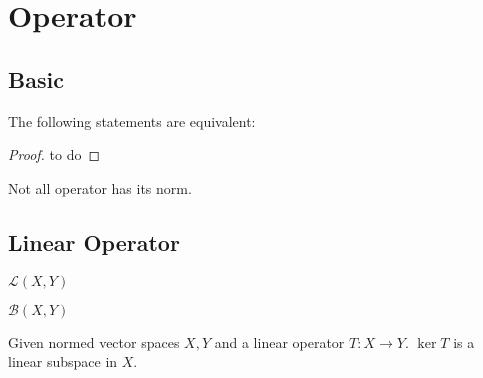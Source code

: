 \chapter{Operator}

\section{Basic}

\begin{definition}[kernel]
\end{definition}

\begin{definition}
\end{definition}

\begin{definition}
\end{definition}

\begin{theorem}
The following statements are equivalent: 
\end{theorem}

\begin{proof}
to do
\end{proof}

\begin{warning}
Not all operator has its norm. 
\end{warning}

\section{Linear Operator}

\begin{definition}
\end{definition}

\begin{notation}
$\mathcal{L}(X, Y)$
\end{notation}

\begin{definition}
\end{definition}

\begin{notation}
$\mathcal{B}(X, Y)$
\end{notation}

\begin{theorem}
Given normed vector spaces $X, Y$ and a linear operator $T \colon X \to Y$. $\ker T$ is a linear subspace in $X$. 
\end{theorem}

